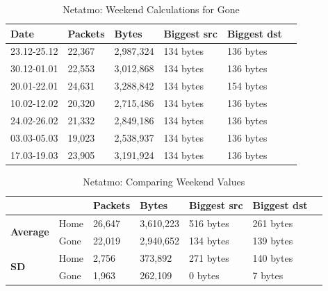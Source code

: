 \begin{table}[H]
    \centering
    \caption{Netatmo: Weekend Calculations for Gone}
    \begin{tabular}{|l|l|l|l|l|l|}
    \hline
        \textbf{Date} & \textbf{Packets} & \textbf{Bytes} & \textbf{Biggest src} & \textbf{Biggest dst} \\ \hline
        23.12-25.12   & 22,367           & 2,987,324      & 134 bytes            & 136 bytes            \\ \hline
        30.12-01.01   & 22,553           & 3,012,868      & 134 bytes            & 136 bytes            \\ \hline
        20.01-22.01   & 24,631           & 3,288,842      & 134 bytes            & 154 bytes            \\ \hline
        10.02-12.02   & 20,320           & 2,715,486      & 134 bytes            & 136 bytes            \\ \hline
        24.02-26.02   & 21,332           & 2,849,186      & 134 bytes            & 136 bytes            \\ \hline
        03.03-05.03   & 19,023           & 2,538,937      & 134 bytes            & 136 bytes            \\ \hline
        17.03-19.03   & 23,905           & 3,191,924      & 134 bytes            & 136 bytes            \\ \hline
    \end{tabular}
    \label{tab:NetatmoGoneWeekends}
\end{table}

\begin{table}[H]
    \centering
    \caption{Netatmo: Comparing Weekend Values}
    \begin{tabular}{ll|l|l|l|l|l|}
        \cline{3-6}
        &      & \textbf{Packets} & \textbf{Bytes} & \textbf{Biggest src} & \textbf{Biggest dst} \\ \hline
    \multicolumn{1}{|l|}{\multirow{2}{*}{\textbf{Average}}} & Home & 26,647          & 3,610,223    & 516 bytes                 & 261 bytes                 \\ \cline{2-6} 
    \multicolumn{1}{|l|}{}                              & Gone & 22,019          & 2,940,652    & 134 bytes                    & 139 bytes                 \\ \hline
    \multicolumn{1}{|l|}{\multirow{2}{*}{\textbf{SD}}} & Home & 2,756            & 373,892      & 271 bytes                 & 140 bytes                 \\ \cline{2-6} 
    \multicolumn{1}{|l|}{}                             & Gone & 1,963            & 262,109      & 0 bytes                   & 7 bytes                   \\ \hline
    \end{tabular}
    \label{tab:NetatmoWeekends}
\end{table}

